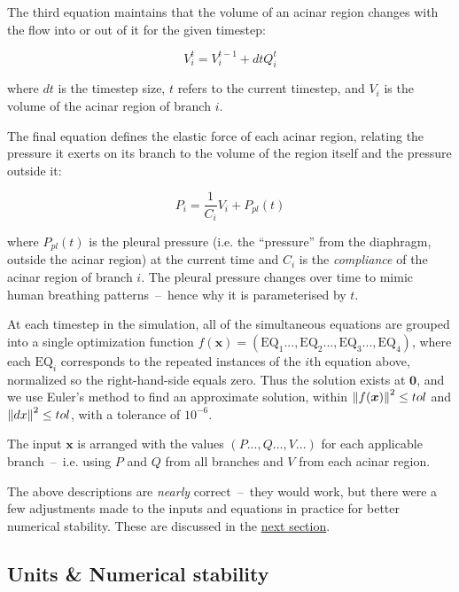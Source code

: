 The third equation maintains that the volume of an acinar region changes with the flow into or out
of it for the given timestep:

\begin{equation}
    V_i^t = V_i^{t-1} + dt Q_i^t
\end{equation}

\noindent
where $dt$ is the timestep size, $t$ refers to the current timestep, and $V_i$ is the volume of the
acinar region of branch $i$.

The final equation defines the elastic force of each acinar region, relating the pressure it exerts
on its branch to the volume of the region itself and the pressure outside it:

\begin{equation} \label{eq:acinar-pressure-volume-naive}
    P_i = \frac{1}{C_i} V_i + P_{pl}(t)
\end{equation}

\noindent
where $P_{pl}(t)$ is the pleural pressure (i.e. the ``pressure'' from the diaphragm, outside the
acinar region) at the current time and $C_i$ is the \textit{compliance} of the acinar region of
branch $i$. The pleural pressure changes over time to mimic human breathing patterns~--~hence why it
is parameterised by $t$.

\breakpars

At each timestep in the simulation, all of the simultaneous equations are grouped into a single
optimization function $f(\bm{x}) = (\text{EQ}_1..., \text{EQ}_2..., \text{EQ}_3..., \text{EQ}_4)$,
where each $\text{EQ}_i$ corresponds to the repeated instances of the $i$th equation above,
normalized so the right-hand-side equals zero. Thus the solution exists at $\bm{0}$, and we use
Euler's method to find an approximate solution, within $\left\lVert f(\bm{x})\right\rVert^2 \le tol$ and
$\left\lVert dx\right\rVert^2 \le tol$, with a tolerance of $10^{-6}$.

The input $\bm{x}$ is arranged with the values $(P..., Q..., V...)$ for each applicable
branch~--~i.e. using $P$ and $Q$ from all branches and $V$ from each acinar region.

\breakpars

The above descriptions are \textit{nearly} correct~--~they would work, but there were a few
adjustments made to the inputs and equations in practice for better numerical stability. These are
discussed in the \hyperref[sec:units-and-numerical-stability]{next section}.

\subsection{Units \& Numerical stability} \label{sec:units-and-numerical-stability}

